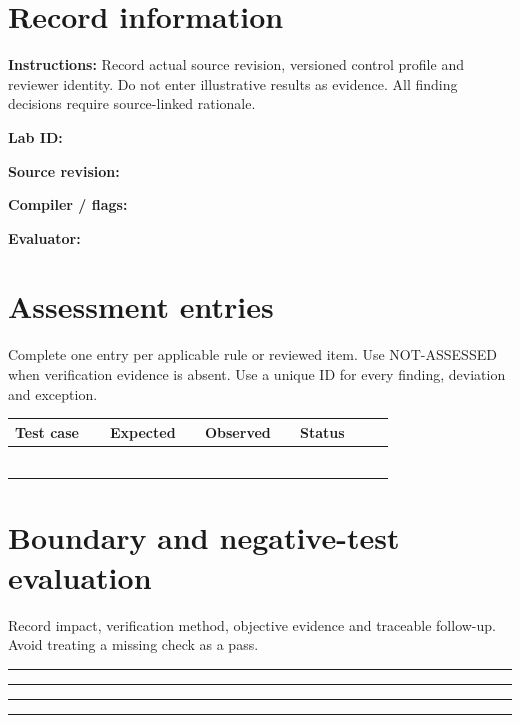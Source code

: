 \documentclass[10pt,letterpaper]{article}
\begin{document}
\makedoctitle
\makedocsummary
\section{Record information}
\textbf{Instructions:} Record actual source revision, versioned control profile and reviewer identity. Do not enter illustrative results as evidence. All finding decisions require source-linked rationale.\par\medskip
\noindent\textbf{Lab ID:}\quad\hrulefill\par\vspace{11pt}
\noindent\textbf{Source revision:}\quad\hrulefill\par\vspace{11pt}
\noindent\textbf{Compiler / flags:}\quad\hrulefill\par\vspace{11pt}
\noindent\textbf{Evaluator:}\quad\hrulefill\par\vspace{11pt}
\section{Assessment entries}
Complete one entry per applicable rule or reviewed item. Use NOT-ASSESSED when verification evidence is absent. Use a unique ID for every finding, deviation and exception.\par\medskip
\begin{longtable}{|p{0.215\linewidth}|p{0.215\linewidth}|p{0.215\linewidth}|p{0.215\linewidth}|}
\hline
\textbf{Test case} & \textbf{Expected} & \textbf{Observed} & \textbf{Status}\\\hline
\endhead
\rule{0pt}{27pt} & & & \\\hline
\rule{0pt}{27pt} & & & \\\hline
\rule{0pt}{27pt} & & & \\\hline
\rule{0pt}{27pt} & & & \\\hline
\rule{0pt}{27pt} & & & \\\hline
\rule{0pt}{27pt} & & & \\\hline
\end{longtable}
\section{Boundary and negative-test evaluation}
Record impact, verification method, objective evidence and traceable follow-up. Avoid treating a missing check as a pass.\par\medskip
\noindent\rule{\linewidth}{0.4pt}\par\vspace{16pt}
\noindent\rule{\linewidth}{0.4pt}\par\vspace{16pt}
\noindent\rule{\linewidth}{0.4pt}\par\vspace{16pt}
\noindent\rule{\linewidth}{0.4pt}\par\vspace{16pt}
\end{document}
